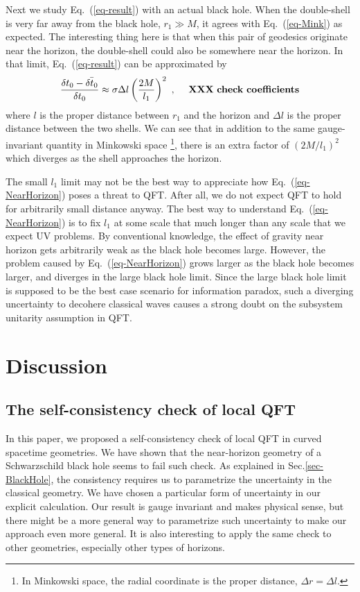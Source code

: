 \documentclass[aps,showpacs,twocolumn,floats,prd,superscriptaddress,nofootinbib]{revtex4-1}
\begin{document}
Next we study Eq.~(\ref{eq-result}) with an actual black hole. 
When the double-shell is very far away from the black hole, $r_1\gg M$, it agrees with Eq.~(\ref{eq-Mink}) as expected. 
The interesting thing here is that when this pair of geodesics originate near the horizon, the double-shell could also be somewhere near the horizon. 
In that limit, Eq.~(\ref{eq-result}) can be approximated by
\begin{equation}
\frac{\delta t_0 - \bar{\delta t_0}}{\delta t_0} \approx
\sigma \Delta l \left(\frac{2M}{l_1}\right)^2~, \ \ \ \ {\rm \bf XXX \ check \ coefficients}
\label{eq-NearHorizon}
\end{equation}
where $l$ is the proper distance between $r_1$ and the horizon and $\Delta l$ is the proper distance between the two shells. 
We can see that in addition to the same gauge-invariant quantity in Minkowski space
\footnote{In Minkowski space, the radial coordinate is the proper distance, $\Delta r=\Delta l$.}, 
there is an extra factor of $(2M/l_1)^2$ which diverges as the shell approaches the horizon.

The small $l_1$ limit may not be the best way to appreciate how Eq.~(\ref{eq-NearHorizon}) poses a threat to QFT. 
After all, we do not expect QFT to hold for arbitrarily small distance anyway. 
The best way to understand Eq.~(\ref{eq-NearHorizon}) is to fix $l_1$ at some scale that much longer than any scale that we expect UV problems. 
By conventional knowledge, the effect of gravity near horizon gets arbitrarily weak as the black hole becomes large. 
However, the problem caused by Eq.~(\ref{eq-NearHorizon}) grows larger as the black hole becomes larger, and diverges in the large black hole limit.
Since the large black hole limit is supposed to be the best case scenario for information paradox, such a diverging uncertainty to decohere classical waves causes a strong doubt on the subsystem unitarity assumption in QFT.


\section{Discussion}

\subsection{The self-consistency check of local QFT}

In this paper, we proposed a self-consistency check of local QFT in curved spacetime geometries.
We have shown that the near-horizon geometry of a Schwarzschild black hole seems to fail such check.
As explained in Sec.\ref{sec-BlackHole}, the consistency requires us to parametrize the uncertainty in the classical geometry.
We have chosen a particular form of uncertainty in our explicit calculation.
Our result is gauge invariant and makes physical sense, but there might be a more general way to parametrize such uncertainty to make our approach even more general.
It is also interesting to apply the same check to other geometries, especially other types of horizons.
\end{document}
